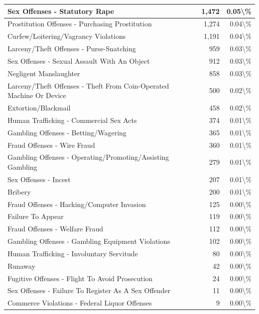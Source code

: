 \documentclass[
]{krantz}
\begin{document}
\begin{longtable}[t]{l|r|r}
\hline
Sex Offenses - Statutory Rape & 1,472 & 0.05\textbackslash{}\%\\
\hline
Prostitution Offenses - Purchasing Prostitution & 1,274 & 0.04\textbackslash{}\%\\
\hline
Curfew/Loitering/Vagrancy Violations & 1,191 & 0.04\textbackslash{}\%\\
\hline
Larceny/Theft Offenses - Purse-Snatching & 959 & 0.03\textbackslash{}\%\\
\hline
Sex Offenses - Sexual Assault With An Object & 912 & 0.03\textbackslash{}\%\\
\hline
Negligent Manslaughter & 858 & 0.03\textbackslash{}\%\\
\hline
Larceny/Theft Offenses - Theft From Coin-Operated Machine Or Device & 500 & 0.02\textbackslash{}\%\\
\hline
Extortion/Blackmail & 458 & 0.02\textbackslash{}\%\\
\hline
Human Trafficking - Commercial Sex Acts & 374 & 0.01\textbackslash{}\%\\
\hline
Gambling Offenses - Betting/Wagering & 365 & 0.01\textbackslash{}\%\\
\hline
Fraud Offenses - Wire Fraud & 360 & 0.01\textbackslash{}\%\\
\hline
Gambling Offenses - Operating/Promoting/Assisting Gambling & 279 & 0.01\textbackslash{}\%\\
\hline
Sex Offenses - Incest & 207 & 0.01\textbackslash{}\%\\
\hline
Bribery & 200 & 0.01\textbackslash{}\%\\
\hline
Fraud Offenses - Hacking/Computer Invasion & 125 & 0.00\textbackslash{}\%\\
\hline
Failure To Appear & 119 & 0.00\textbackslash{}\%\\
\hline
Fraud Offenses - Welfare Fraud & 112 & 0.00\textbackslash{}\%\\
\hline
Gambling Offenses - Gambling Equipment Violations & 102 & 0.00\textbackslash{}\%\\
\hline
Human Trafficking - Involuntary Servitude & 80 & 0.00\textbackslash{}\%\\
\hline
Runaway & 42 & 0.00\textbackslash{}\%\\
\hline
Fugitive Offenses - Flight To Avoid Prosecution & 24 & 0.00\textbackslash{}\%\\
\hline
Sex Offenses - Failure To Register As A Sex Offender & 11 & 0.00\textbackslash{}\%\\
\hline
Commerce Violations - Federal Liquor Offenses & 9 & 0.00\textbackslash{}\%\\

\end{longtable}
\end{document}
